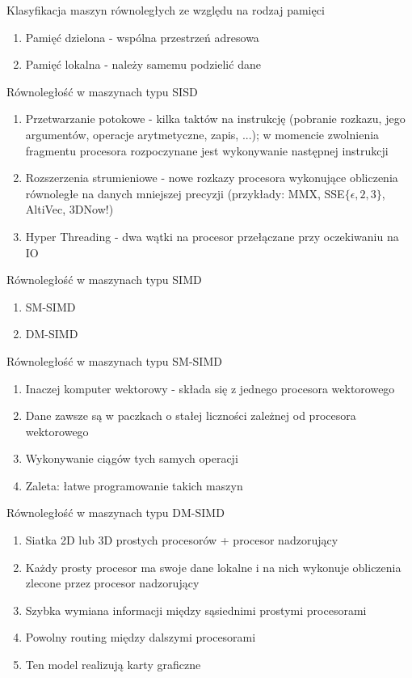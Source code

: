 \documentclass{beamer}
\begin{document}
\begin{frame}{Klasyfikacja maszyn równoległych ze względu na rodzaj pamięci}
  \begin{enumerate}
  \item Pamięć dzielona - wspólna przestrzeń adresowa
  \item Pamięć lokalna - należy samemu podzielić dane
  \end{enumerate}
\end{frame}

\begin{frame}{Równoległość w maszynach typu SISD}
  \begin{enumerate}
  \item Przetwarzanie potokowe - kilka taktów na instrukcję (pobranie rozkazu, jego argumentów, operacje arytmetyczne, zapis, ...); w momencie zwolnienia fragmentu procesora rozpoczynane jest wykonywanie następnej instrukcji
  \item Rozszerzenia strumieniowe - nowe rozkazy procesora wykonujące obliczenia równoległe na danych mniejszej precyzji (przykłady: MMX, SSE$\{\epsilon,2,3\}$, AltiVec, 3DNow!)
  \item Hyper Threading - dwa wątki na procesor przełączane przy oczekiwaniu na IO
  \end{enumerate}
\end{frame}

\begin{frame}{Równoległość w maszynach typu SIMD}
  \begin{enumerate}
  \item SM-SIMD
  \item DM-SIMD
  \end{enumerate}
\end{frame}

\begin{frame}{Równoległość w maszynach typu SM-SIMD}
  \begin{enumerate}
  \item Inaczej komputer wektorowy - składa się z jednego procesora wektorowego
  \item Dane zawsze są w paczkach o stałej liczności zależnej od procesora wektorowego
  \item Wykonywanie ciągów tych samych operacji
  \item Zaleta: łatwe programowanie takich maszyn
  \end{enumerate}
\end{frame}

\begin{frame}{Równoległość w maszynach typu DM-SIMD}
  \begin{enumerate}
  \item Siatka 2D lub 3D prostych procesorów + procesor nadzorujący
  \item Każdy prosty procesor ma swoje dane lokalne i na nich wykonuje obliczenia zlecone przez procesor nadzorujący
  \item Szybka wymiana informacji między sąsiednimi prostymi procesorami
  \item Powolny routing między dalszymi procesorami
  \item Ten model realizują karty graficzne
  \end{enumerate}
\end{frame}
\end{document}
